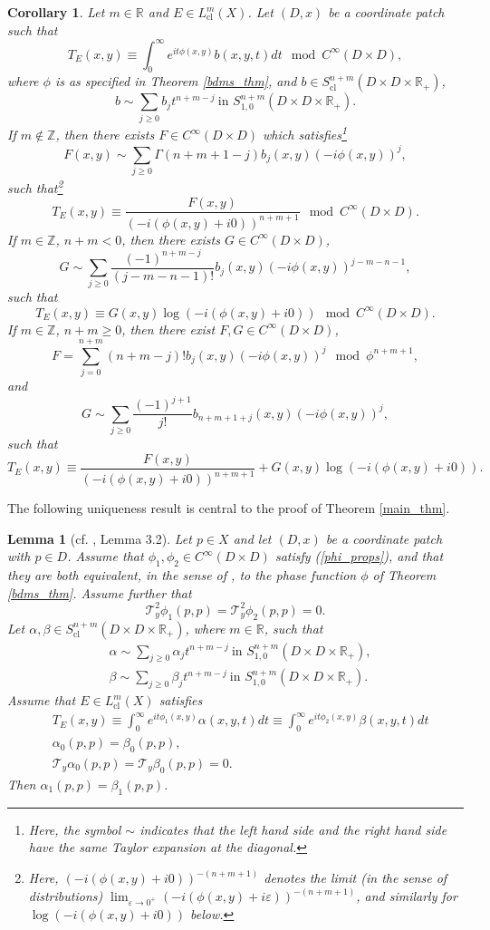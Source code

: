 \documentclass{article}
\newtheorem{lemma}[theorem]{Lemma}
\newtheorem{corollary}[theorem]{Corollary}
\newcommand{\RR}{\mathbb R}
\newcommand{\ZZ}{\mathbb Z}
\newcommand{\mct}{\mathcal T}
\DeclareMathOperator{\cl}{cl}
\begin{document}
\begin{corollary} Let $m \in \RR$ and $E \in L^m_{\cl}(X)$. Let $(D,x)$ be a coordinate patch such that $$T_E(x,y) \equiv \int_0^\infty e^{it \phi(x,y)}b(x,y,t) dt \mod C^\infty(D \times D),$$
where $\phi$ is as specified in Theorem \ref{bdms_thm}, and $b \in S^{n+m}_{\cl}(D \times D \times \RR_+)$, $$b \sim \sum_{j \ge 0} b_{j} t^{n+m-j}\ \text{in } S^{n+m}_{1,0}(D \times D \times \RR_+).$$ If $m \not \in \ZZ$, then there exists $F \in C^\infty(D \times D)$ which satisfies\footnote{Here, the symbol $\sim$ indicates that the left hand side and the right hand side have the same Taylor expansion at the diagonal.} $$F(x,y) \sim \sum_{j\ge 0}\Gamma(n+m+1-j) b_j(x,y) (-i \phi(x,y))^j,$$
such that\footnote{Here, $(-i(\phi(x,y) + i0))^{-(n+m+1)}$ denotes the limit (in the sense of distributions) $\lim_{\varepsilon \to 0^+}(-i(\phi(x,y) + i\varepsilon))^{-(n+m+1)}$, and similarly for $\log(-i(\phi(x,y) + i 0))$ below.} $$T_E(x,y) \equiv \frac {F(x,y)} {(-i(\phi(x,y) + i0))^{n+m+1}} \mod C^\infty(D \times D).$$
If $m \in \ZZ$, $n+m < 0$, then there exists $G \in C^\infty(D \times D)$, $$G \sim \sum_{j \ge 0} \frac{(-1)^{n+m-j}}{(j-m-n-1)!} b_j(x,y)(-i\phi(x,y))^{j-m-n-1},$$
such that $$T_E(x,y) \equiv G(x,y) \log(-i(\phi(x,y) + i0)) \mod C^\infty(D \times D).$$
If $m \in \ZZ$, $n+m \ge 0$, then there exist $F, G \in C^\infty(D \times D)$, $$F = \sum_{j=0}^{n+m} (n+m-j)!b_j(x,y) (-i \phi(x,y))^j \mod \phi^{n+m+1},$$
and $$G \sim \sum_{j \ge 0} \frac{(-1)^{j+1}}{j!} b_{n+m+1+j}(x,y)(-i\phi(x,y))^j,$$
such that $$T_E(x,y) \equiv \frac{F(x,y)}{(-i(\phi(x,y)+i0))^{n+m+1}} + G(x,y) \log(-i(\phi(x,y)+i0)).$$
%
%
\end{corollary}
%
The following uniqueness result is central to the proof of Theorem \ref{main_thm}.
%
\begin{lemma}[cf. \cite{hsiao_shen}, Lemma 3.2]\label{pointwise_uniqueness} Let $p \in X$ and let $(D, x)$ be a coordinate patch with $p \in D$. Assume that $\phi_1, \phi_2 \in C^\infty(D \times D)$ satisfy (\ref{phi_props}), and that they are both equivalent, in the sense of \cite{ms}, to the phase function $\phi$ of Theorem \ref{bdms_thm}. Assume further that $$\mct^2_y \phi_1(p,p) = \mct^2_y \phi_2(p,p) = 0.$$
Let $\alpha, \beta \in S^{n+m}_{\cl}(D \times D \times \RR_+)$, where $m \in \RR$, such that $$\begin{aligned} &\alpha \sim \sum_{j \ge 0} \alpha_j t^{n+m-j} \ \text{in } S^{n+m}_{1,0}(D \times D \times \RR_+),\\ &\beta \sim \sum_{j \ge 0} \beta_j t^{n+m-j} \ \text{in } S^{n+m}_{1,0}(D \times D \times \RR_+).\end{aligned}$$
Assume that $E \in L^m_{\cl}(X)$ satisfies $$\begin{aligned} & T_E(x,y) \equiv \int_0^\infty e^{it \phi_1(x,y)} \alpha(x,y,t) dt \equiv \int_0^\infty e^{it \phi_2(x,y)} \beta(x,y,t) dt\\ & \alpha_0(p,p) = \beta_0(p,p),\\ &\mct_y \alpha_0(p,p) = \mct_y \beta_0(p,p) = 0. \end{aligned}$$
Then $\alpha_1(p,p) = \beta_1(p,p)$.
%
\end{lemma}
\end{document}
